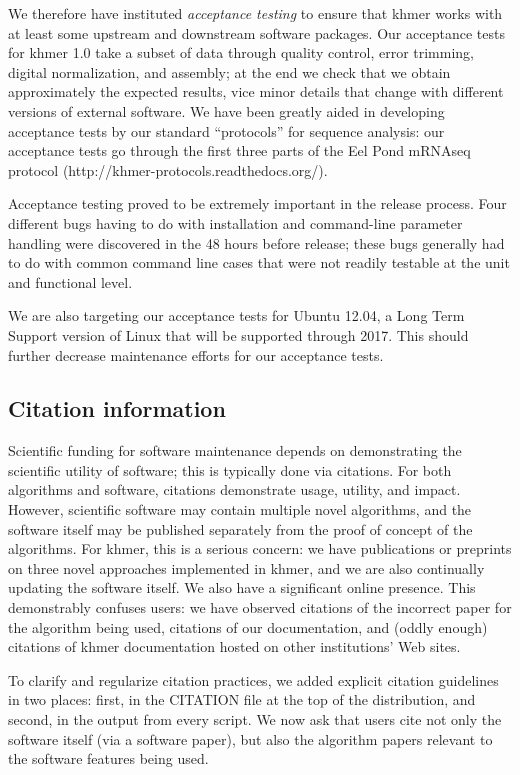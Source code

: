 \documentclass[12pt]{article}
\begin{document}
We therefore have instituted {\em acceptance testing} to ensure that
khmer works with at least some upstream and downstream software
packages.  Our acceptance tests for khmer 1.0 take a subset of data
through quality control, error trimming, digital normalization, and
assembly; at the end we check that we obtain approximately the
expected results, vice minor details that change with different
versions of external software.  We have been greatly aided in
developing acceptance tests by our standard ``protocols'' for sequence
analysis: our acceptance tests go through the first three parts of the
Eel Pond mRNAseq protocol (http://khmer-protocols.readthedocs.org/).

Acceptance testing proved to be extremely important in the release
process.  Four different bugs having to do with installation and
command-line parameter handling were discovered in the 48 hours before
release; these bugs generally had to do with common command line cases
that were not readily testable at the unit and functional level.

We are also targeting our acceptance tests for Ubuntu 12.04, a Long
Term Support version of Linux that will be supported through 2017.
This should further decrease maintenance efforts for our acceptance
tests.

\subsection{Citation information}

Scientific funding for software maintenance depends on demonstrating
the scientific utility of software; this is typically done via
citations.  For both algorithms and software, citations demonstrate
usage, utility, and impact.  However, scientific software may contain
multiple novel algorithms, and the software itself may be published
separately from the proof of concept of the algorithms.  For khmer,
this is a serious concern: we have publications or preprints on three
novel approaches implemented in khmer, and we are also continually
updating the software itself.  We also have a significant online
presence. This demonstrably confuses users: we have observed citations
of the incorrect paper for the algorithm being used, citations of our
documentation, and (oddly enough) citations of khmer documentation
hosted on other institutions' Web sites.

To clarify and regularize citation practices, we added explicit
citation guidelines in two places: first, in the CITATION file at the
top of the distribution, and second, in the output from every script.
We now ask that users cite not only the software itself (via a
software paper), but also the algorithm papers relevant to the
software features being used.
\end{document}
